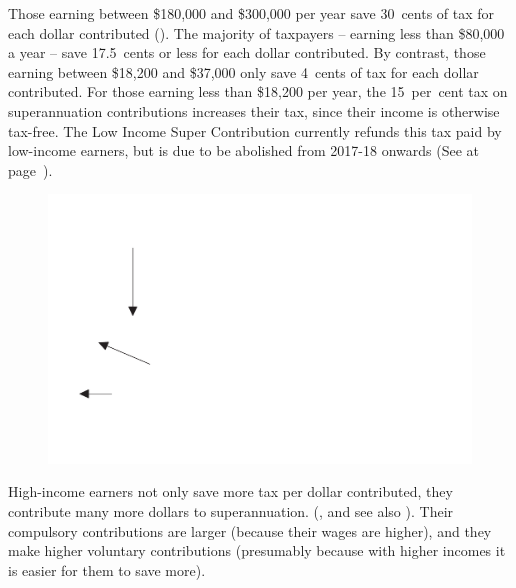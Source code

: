 Those earning between \$180,000 and \$300,000 per year save 30~cents of tax for each dollar contributed ().  The majority of taxpayers – earning less than \$80,000 a year – save 17.5~cents or less for each dollar contributed. By contrast, those earning between \$18,200 and \$37,000 only save 4~cents of tax for each dollar contributed.  For those earning less than \$18,200 per year, the 15~per~cent tax on superannuation contributions increases their tax, since their income is otherwise tax-free. The Low Income Super Contribution currently refunds this tax paid by low-income earners, but is due to be abolished from 2017-18 onwards (See  at page~\pageref{sec:SUPER-LISC-to-be-abolished}).

\begin{figure}[hp]
\label{fig:SUPER-4-2}
\includegraphics[width=\linewidth]{b5-super-atlas/Figure4-2-1.pdf}

\end{figure}

High-income earners not only save more tax per dollar contributed, they contribute many more dollars to superannuation. (, and see also ). Their compulsory contributions are larger (because their wages are higher), and they make higher voluntary contributions (presumably because with higher incomes it is easier for them to save more). 


